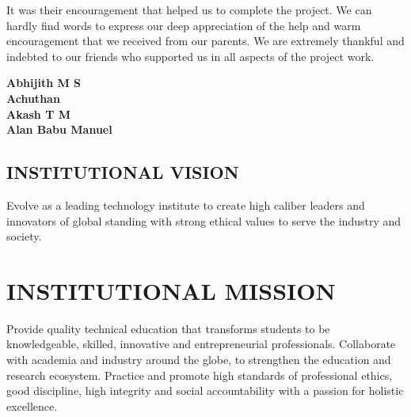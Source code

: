 \documentclass[12pt,a4paper]{report}
\begin{document}
\hspace*{0.5cm}It was their encouragement that helped us to complete the project. We can hardly find words to express our deep appreciation of the help and warm encouragement that we received from our parents. We are extremely thankful and indebted to our friends who supported us in all aspects of the project work.\\
\vspace{1cm}

\begin{flushright}
\textbf{Abhijith M S}\\
\vspace{0.5 cm}
\textbf{Achuthan}\\
\vspace{0.5 cm}
\textbf{Akash T M}\\
\vspace{0.5 cm}
\textbf{Alan Babu Manuel}\\
\end{flushright}


\newpage
\pagestyle{plain}

\begin{center}

\section*{\normalsize{\textbf{INSTITUTIONAL VISION}}}

\end{center}
\doublespacing
Evolve as a leading technology institute to create high caliber leaders and innovators
of global standing with strong ethical values to serve the industry and society.\\
\section*{\hfil\normalsize{\textbf{INSTITUTIONAL MISSION}}\hfil}
Provide quality technical education that transforms students to be knowledgeable,
skilled, innovative and entrepreneurial professionals.
Collaborate with academia and industry around the globe, to strengthen the education
and research ecosystem.
Practice and promote high standards of professional ethics, good discipline, high
integrity and social accountability with a passion for holistic excellence.\\
\end{document}
